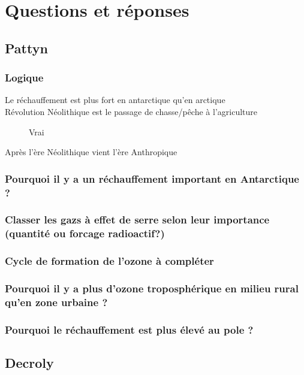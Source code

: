 \section{Questions et réponses}
\subsection{Pattyn}
\subsubsection{Logique}
\begin{description}
	\item [Le réchauffement est plus fort en antarctique qu'en arctique]
    \color{cyan}\color{black}
    
	\item [Révolution Néolithique est le passage de chasse/pêche à l'agriculture]
    \color{cyan}Vrai\color{black}
   
	\item [Après l'ère Néolithique vient l'ère Anthropique]
    \color{cyan}\color{black}
\end{description}

\subsubsection{Pourquoi il y a un réchauffement important en Antarctique ?}
\subsubsection{Classer les gazs à effet de serre selon leur importance (quantité ou forcage radioactif?)}
\subsubsection{Cycle de formation de l'ozone à compléter}
\subsubsection{Pourquoi il y a plus d'ozone troposphérique en milieu rural qu'en zone urbaine ?}
\subsubsection{Pourquoi le réchauffement est plus élevé au pole ?}



\subsection{Decroly}
